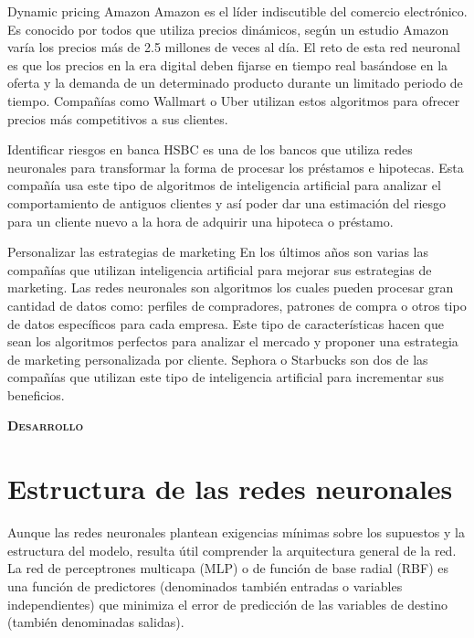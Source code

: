 \documentclass[letterpaper,12pt]{article}
\begin{document}
Dynamic pricing Amazon\newline
Amazon es el líder indiscutible del comercio electrónico. Es conocido por todos que utiliza precios dinámicos, según un estudio Amazon varía los precios más de 2.5 millones de veces al día. El reto de esta red neuronal es que los precios en la era digital deben fijarse en tiempo real basándose en la oferta y la demanda de un determinado producto durante un limitado periodo de tiempo. Compañías como Wallmart o Uber utilizan estos algoritmos para ofrecer precios más competitivos a sus clientes.

Identificar riesgos en banca\newline
HSBC es una de los bancos que utiliza redes neuronales para transformar la forma de procesar los préstamos e hipotecas. Esta compañía usa este tipo de algoritmos de inteligencia artificial para analizar el comportamiento de antiguos clientes y así poder dar una estimación del riesgo para un cliente nuevo a la hora de adquirir una hipoteca o préstamo.

Personalizar las estrategias de marketing\newline
En los últimos años son varias las compañías que utilizan inteligencia artificial para mejorar sus estrategias de marketing. Las redes neuronales son algoritmos los cuales pueden procesar gran cantidad de datos como: perfiles de compradores, patrones de compra o otros tipo de datos específicos para cada empresa. Este tipo de características hacen que sean los algoritmos perfectos para analizar el mercado y proponer una estrategia de marketing personalizada por cliente. Sephora o Starbucks son dos de las compañías que utilizan este tipo de inteligencia artificial para incrementar sus beneficios.

{\scshape\LARGE \textbf{Desarrollo} \par}

\section{Estructura de las redes neuronales}
    
Aunque las redes neuronales plantean exigencias mínimas sobre los supuestos y la estructura del modelo, resulta útil comprender la arquitectura general de la red. La red de perceptrones multicapa (MLP) o de función de base radial (RBF) es una función de predictores (denominados también entradas o variables independientes) que minimiza el error de predicción de las variables de destino (también denominadas salidas).
\end{document}
